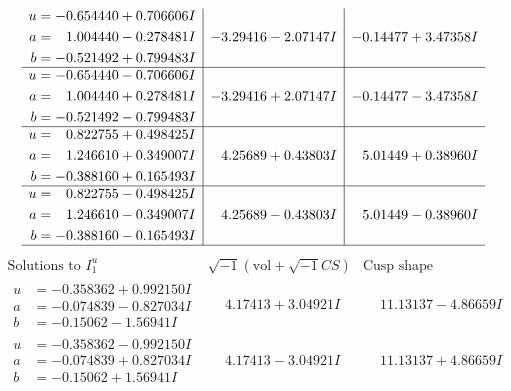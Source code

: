 \documentclass[1p]{elsarticle_modified}
\theoremstyle{definition}
\newcommand{\I}{\sqrt{-1}}
\begin{document}
$$\begin{array}{c|c|c}
\begin{aligned}
u &= -0.654440 + 0.706606 I \\
a &= \phantom{-}1.004440 - 0.278481 I \\
b &= -0.521492 + 0.799483 I\end{aligned}
 & -3.29416 - 2.07147 I & -0.14477 + 3.47358 I \\ \hline\begin{aligned}
u &= -0.654440 - 0.706606 I \\
a &= \phantom{-}1.004440 + 0.278481 I \\
b &= -0.521492 - 0.799483 I\end{aligned}
 & -3.29416 + 2.07147 I & -0.14477 - 3.47358 I \\ \hline\begin{aligned}
u &= \phantom{-}0.822755 + 0.498425 I \\
a &= \phantom{-}1.246610 + 0.349007 I \\
b &= -0.388160 + 0.165493 I\end{aligned}
 & \phantom{-}4.25689 + 0.43803 I & \phantom{-}5.01449 + 0.38960 I \\ \hline\begin{aligned}
u &= \phantom{-}0.822755 - 0.498425 I \\
a &= \phantom{-}1.246610 - 0.349007 I \\
b &= -0.388160 - 0.165493 I\end{aligned}
 & \phantom{-}4.25689 - 0.43803 I & \phantom{-}5.01449 - 0.38960 I\\
 \hline 
 \end{array}$$\newpage$$\begin{array}{c|c|c}  
\text{Solutions to }I^u_{1}& \I (\text{vol} + \sqrt{-1}CS) & \text{Cusp shape}\\
 \hline 
\begin{aligned}
u &= -0.358362 + 0.992150 I \\
a &= -0.074839 - 0.827034 I \\
b &= -0.15062 - 1.56941 I\end{aligned}
 & \phantom{-}4.17413 + 3.04921 I & \phantom{-}11.13137 - 4.86659 I \\ \hline\begin{aligned}
u &= -0.358362 - 0.992150 I \\
a &= -0.074839 + 0.827034 I \\
b &= -0.15062 + 1.56941 I\end{aligned}
 & \phantom{-}4.17413 - 3.04921 I & \phantom{-}11.13137 + 4.86659 I \\ \hline\begin{aligned}

\end{aligned}
\end{array}$$
\end{document}

